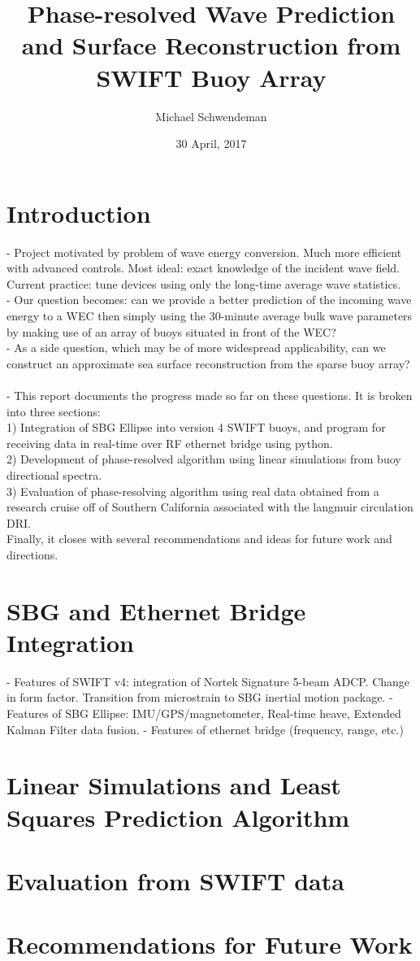 \documentclass[11pt]{amsart}
\title{Phase-resolved Wave Prediction and Surface Reconstruction from SWIFT Buoy Array}
\author{Michael Schwendeman}
\date{30 April, 2017}                                           %
\begin{document}
\maketitle
\section{Introduction}
- Project motivated by problem of wave energy conversion.  Much more efficient with advanced controls.  Most ideal: exact knowledge of the incident wave field.  Current practice: tune devices using only the long-time average wave statistics. \\
- Our question becomes: can we provide a better prediction of the incoming wave energy to a WEC then simply using the 30-minute average bulk wave parameters by making use of an array of buoys situated in front of the WEC?\\
- As a side question, which may be of more widespread applicability, can we construct an approximate sea surface reconstruction from the sparse buoy array?\\
\\
- This report documents the progress made so far on these questions.  It is broken into three sections:\\
1) Integration of SBG Ellipse into version 4 SWIFT buoys, and program for receiving data in real-time over RF ethernet bridge using python.\\
2) Development of phase-resolved algorithm using linear simulations from buoy directional spectra.\\
3) Evaluation of phase-resolving algorithm using real data obtained from a research cruise off of Southern California associated with the langmuir circulation DRI.\\
Finally, it closes with several recommendations and ideas for future work and directions.

\section{SBG and Ethernet Bridge Integration}
- Features of SWIFT v4: integration of Nortek Signature 5-beam ADCP.  Change in form factor.  Transition from microstrain to SBG inertial motion package.
- Features of SBG Ellipse: IMU/GPS/magnetometer, Real-time heave, Extended Kalman Filter data fusion.
- Features of ethernet bridge (frequency, range, etc.)

\section{Linear Simulations and Least Squares Prediction Algorithm}

\section{Evaluation from SWIFT data}

\section{Recommendations for Future Work}
\end{document}

